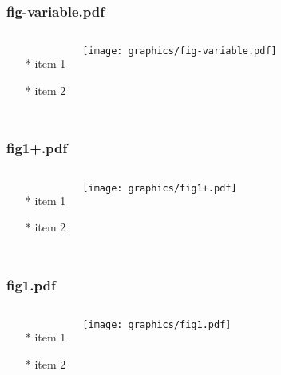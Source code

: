 \documentclass{beamer}
\begin{document}
\begin{frame} \frametitle{fig-variable.pdf}
    \begin{columns}[c]
        \begin{itemize}
            \item[*] item 1
            \item[*] item 2
        \end{itemize}
        \begin{minipage}{\linewidth}
            \begin{center}
            \texttt{[image: graphics/fig-variable.pdf]}
            \label{gfx:fig-variable.pdf}
            \end{center}
        \end{minipage}
    \end{columns}
\end{frame}
\begin{frame} \frametitle{fig1+.pdf}
    \begin{columns}[c]
        \begin{itemize}
            \item[*] item 1
            \item[*] item 2
        \end{itemize}
        \begin{minipage}{\linewidth}
            \begin{center}
            \texttt{[image: graphics/fig1+.pdf]}
            \label{gfx:fig1+.pdf}
            \end{center}
        \end{minipage}
    \end{columns}
\end{frame}
\begin{frame} \frametitle{fig1.pdf}
    \begin{columns}[c]
        \begin{itemize}
            \item[*] item 1
            \item[*] item 2
        \end{itemize}
        \begin{minipage}{\linewidth}
            \begin{center}
            \texttt{[image: graphics/fig1.pdf]}
            \label{gfx:fig1.pdf}
            \end{center}
        \end{minipage}
    \end{columns}
\end{frame}
\end{document}
